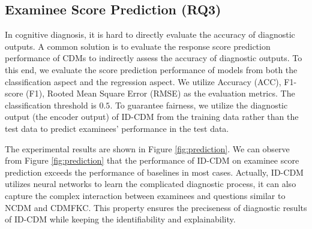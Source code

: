 \documentclass[sigconf]{acmart}
\begin{document}
\subsection{Examinee Score Prediction (RQ3)}\label{sec:exp-accuracy}
\par In cognitive diagnosis, it is hard to directly evaluate the accuracy of diagnostic outputs. A common solution is to evaluate the response score prediction performance of CDMs to indirectly assess the accuracy of diagnostic outputs. To this end, we evaluate the score prediction performance of models from both the classification aspect and the regression aspect. We utilize Accuracy (ACC), F1-score (F1), Rooted Mean Square Error (RMSE) as the evaluation metrics. The classification threshold is $0.5$. To guarantee fairness, we utilize the diagnostic output (the encoder output) of ID-CDM from the training data rather than the test data to predict examinees' performance in the test data.
\par The experimental results are shown in Figure \ref{fig:prediction}. We can observe from Figure \ref{fig:prediction} that the performance of ID-CDM on examinee score prediction exceeds the performance of baselines in most cases. Actually, ID-CDM utilizes neural networks to learn the complicated diagnostic process, it can also capture the complex interaction between examinees and questions similar to NCDM and CDMFKC. This property ensures the preciseness of diagnostic results of ID-CDM while keeping the identifiability and explainability.
 

\vspace{-5pt}
\end{document}
